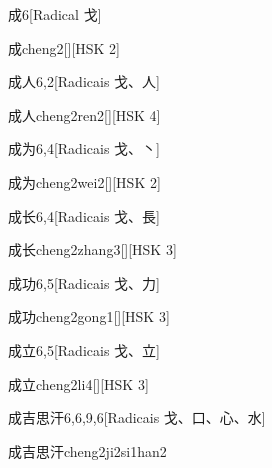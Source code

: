 \begin{entry}{成}{6}[Radical ⼽]
  \begin{phonetics}{成}{cheng2}[][HSK 2]
  \end{phonetics}
\end{entry}

\begin{entry}{成人}{6,2}[Radicais ⼽、⼈]
  \begin{phonetics}{成人}{cheng2ren2}[][HSK 4]
  \end{phonetics}
\end{entry}

\begin{entry}{成为}{6,4}[Radicais ⼽、⼂]
  \begin{phonetics}{成为}{cheng2wei2}[][HSK 2]
  \end{phonetics}
\end{entry}

\begin{entry}{成长}{6,4}[Radicais ⼽、⾧]
  \begin{phonetics}{成长}{cheng2zhang3}[][HSK 3]
  \end{phonetics}
\end{entry}

\begin{entry}{成功}{6,5}[Radicais ⼽、⼒]
  \begin{phonetics}{成功}{cheng2gong1}[][HSK 3]
  \end{phonetics}
\end{entry}

\begin{entry}{成立}{6,5}[Radicais ⼽、⽴]
  \begin{phonetics}{成立}{cheng2li4}[][HSK 3]
  \end{phonetics}
\end{entry}

\begin{entry}{成吉思汗}{6,6,9,6}[Radicais ⼽、⼝、⼼、⽔]
  \begin{phonetics}{成吉思汗}{cheng2ji2si1han2}
  \end{phonetics}
\end{entry}


